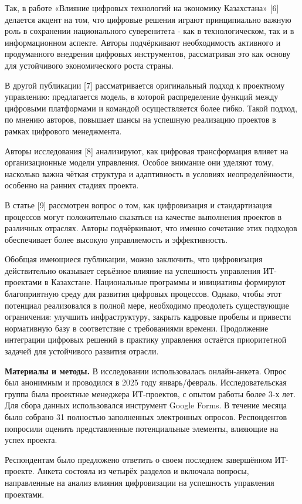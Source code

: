 \begin{multicols}{2}
Так, в работе «Влияние цифровых технологий на экономику Казахстана»
{[}6{]} делается акцент на том, что цифровые решения играют
принципиально важную роль в сохранении национального суверенитета - как
в технологическом, так и в информационном аспекте. Авторы подчёркивают
необходимость активного и продуманного внедрения цифровых инструментов,
рассматривая это как основу для устойчивого экономического роста страны.

В другой публикации {[}7{]} рассматривается оригинальный подход к
проектному управлению: предлагается модель, в которой распределение
функций между цифровыми платформами и командой осуществляется более
гибко. Такой подход, по мнению авторов, повышает шансы на успешную
реализацию проектов в рамках цифрового менеджмента.

Авторы исследования {[}8{]} анализируют, как цифровая трансформация
влияет на организационные модели управления. Особое внимание они уделяют
тому, насколько важна чёткая структура и адаптивность в условиях
неопределённости, особенно на ранних стадиях проекта.

В статье {[}9{]} рассмотрен вопрос о том, как цифровизация и
стандартизация процессов могут положительно сказаться на качестве
выполнения проектов в различных отраслях. Авторы подчёркивают, что
именно сочетание этих подходов обеспечивает более высокую управляемость
и эффективность.

Обобщая имеющиеся публикации, можно заключить, что цифровизация
действительно оказывает серьёзное влияние на успешность управления
ИТ-проектами в Казахстане. Национальные программы и инициативы формируют
благоприятную среду для развития цифровых процессов. Однако, чтобы этот
потенциал реализовался в полной мере, необходимо преодолеть существующие
ограничения: улучшить инфраструктуру, закрыть кадровые пробелы и
привести нормативную базу в соответствие с требованиями времени.
Продолжение интеграции цифровых решений в практику управления остаётся
приоритетной задачей для устойчивого развития отрасли.

{\bfseries Материалы и методы.} В исследовании использовалась
онлайн-анкета. Опрос был анонимным и проводился в 2025 году
январь/февраль. Исследовательская группа была проектные менеджера
ИТ-проектов, с опытом работы более 3-х лет. Для сбора данных
использовался инструмент Google Forms. В течение месяца было собрано 31
полностью заполненных электронных опросов. Респондентов попросили
оценить представленные потенциальные элементы, влияющие на успех
проекта.

Респондентам было предложено ответить о своем последнем завершённом
ИТ-проекте. Анкета состояла из четырёх разделов и включала вопросы,
направленные на анализ влияния цифровизации на успешность управления
проектами.


\end{multicols}
